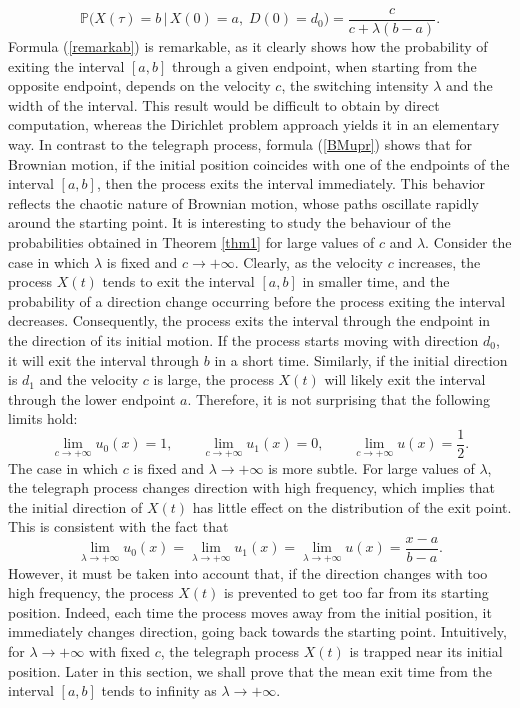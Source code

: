 \documentclass{article}
\begin{document}
\begin{equation}\mathbb{P}\Big(X(\tau)=b\,\Big\lvert\, X(0)=a,\;D(0)=d_0\Big)=\frac{c}{c+\lambda(b-a)}.\label{remarkab}\end{equation}
Formula (\ref{remarkab}) is remarkable, as it clearly shows how the probability of exiting the interval $[a,b]$ through a given endpoint, when starting from the opposite endpoint, depends on the velocity $c$, the switching intensity $\lambda$ and the width of the interval. This result would be difficult to obtain by direct computation, whereas the Dirichlet problem approach yields it in an elementary way. In contrast to the telegraph process, formula (\ref{BMupr}) shows that for Brownian motion, if the initial position coincides with one of the endpoints of the interval $[a,b]$, then the process exits the interval immediately. This behavior reflects the chaotic nature of Brownian motion, whose paths oscillate rapidly around the starting point. It is interesting to study the behaviour of the probabilities obtained in Theorem \ref{thm1} for large values of $c$ and $\lambda$. Consider the case in which $\lambda$ is fixed and $c\to+\infty$. Clearly, as the velocity $c$ increases, the process $X(t)$ tends to exit the interval $[a,b]$ in smaller time, and the probability of a direction change occurring before the process exiting the interval decreases. Consequently, the process exits the interval through the endpoint in the direction of its initial motion. If the process starts moving with direction $d_0$, it will exit the interval through $b$ in a short time. Similarly, if the initial direction is $d_1$ and the velocity $c$ is large, the process $X(t)$ will likely exit the interval through the lower endpoint $a$. Therefore, it is not surprising that the following limits hold:
$$\lim_{c\to+\infty}u_0(x)=1,\qquad \lim_{c\to+\infty}u_1(x)=0, \qquad \lim_{c\to+\infty}u(x)=\frac{1}{2}.$$
The case in which $c$ is fixed and $\lambda\to+\infty$ is more subtle. For large values of $\lambda$, the telegraph process changes direction with high frequency, which implies that the initial direction of $X(t)$ has little effect on the distribution of the exit point. This is consistent with the fact that
$$\lim_{\lambda\to+\infty}u_0(x)=\lim_{\lambda\to+\infty}u_1(x)=\lim_{\lambda\to+\infty}u(x)=\frac{x-a}{b-a}.$$ However, it must be taken into account that, if the direction changes with too high frequency, the process $X(t)$ is prevented to get too far from its starting position. Indeed, each time the process moves away from the initial position, it immediately changes direction, going back towards the starting point. Intuitively, for $\lambda\to+\infty$ with fixed $c$, the telegraph process $X(t)$ is trapped near its initial position. Later in this section, we shall prove that the mean exit time from the interval $[a,b]$ tends to infinity as $\lambda\to+\infty$.\\
\end{document}
